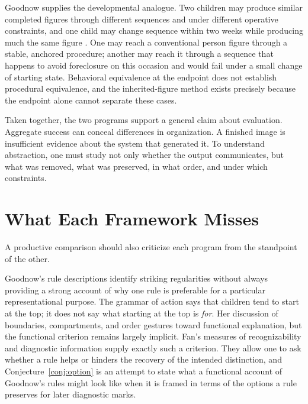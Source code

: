 \documentclass[11pt]{article}
\theoremstyle{remark}
\begin{document}
Goodnow supplies the developmental analogue. Two children may produce similar completed figures through different sequences and under different operative constraints, and one child may change sequence within two weeks while producing much the same figure \cite[p.~23]{goodnow1977}. One may reach a conventional person figure through a stable, anchored procedure; another may reach it through a sequence that happens to avoid foreclosure on this occasion and would fail under a small change of starting state. Behavioral equivalence at the endpoint does not establish procedural equivalence, and the inherited-figure method exists precisely because the endpoint alone cannot separate these cases.

Taken together, the two programs support a general claim about evaluation. Aggregate success can conceal differences in organization. A finished image is insufficient evidence about the system that generated it. To understand abstraction, one must study not only whether the output communicates, but what was removed, what was preserved, in what order, and under which constraints.

\section{What Each Framework Misses}
\label{sec:critique}

A productive comparison should also criticize each program from the standpoint of the other.

Goodnow's rule descriptions identify striking regularities without always providing a strong account of why one rule is preferable for a particular representational purpose. The grammar of action says that children tend to start at the top; it does not say what starting at the top is \emph{for}. Her discussion of boundaries, compartments, and order gestures toward functional explanation, but the functional criterion remains largely implicit. Fan's measures of recognizability and diagnostic information supply exactly such a criterion. They allow one to ask whether a rule helps or hinders the recovery of the intended distinction, and Conjecture~\ref{conj:option} is an attempt to state what a functional account of Goodnow's rules might look like when it is framed in terms of the options a rule preserves for later diagnostic marks.
\end{document}
